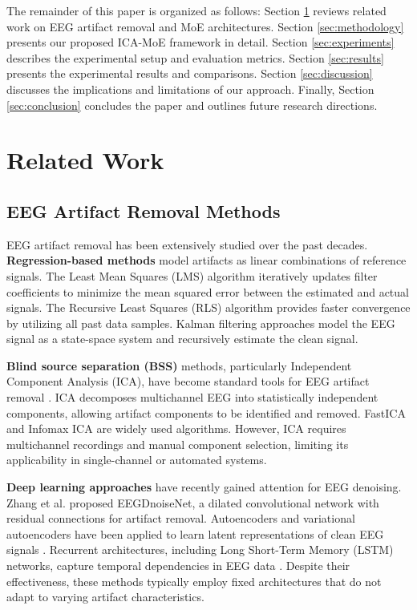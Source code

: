 \documentclass[journal]{IEEEtran}
\begin{document}
The remainder of this paper is organized as follows: Section \ref{sec:related_work} reviews related work on EEG artifact removal and MoE architectures. Section \ref{sec:methodology} presents our proposed ICA-MoE framework in detail. Section \ref{sec:experiments} describes the experimental setup and evaluation metrics. Section \ref{sec:results} presents the experimental results and comparisons. Section \ref{sec:discussion} discusses the implications and limitations of our approach. Finally, Section \ref{sec:conclusion} concludes the paper and outlines future research directions.

\section{Related Work}
\label{sec:related_work}

\subsection{EEG Artifact Removal Methods}

EEG artifact removal has been extensively studied over the past decades. \textbf{Regression-based methods} model artifacts as linear combinations of reference signals. The Least Mean Squares (LMS) algorithm \cite{widrow1975adaptive} iteratively updates filter coefficients to minimize the mean squared error between the estimated and actual signals. The Recursive Least Squares (RLS) algorithm \cite{haykin2014adaptive} provides faster convergence by utilizing all past data samples. Kalman filtering approaches \cite{morbidi2008application} model the EEG signal as a state-space system and recursively estimate the clean signal.

\textbf{Blind source separation (BSS)} methods, particularly Independent Component Analysis (ICA), have become standard tools for EEG artifact removal \cite{jung2000removing}. ICA decomposes multichannel EEG into statistically independent components, allowing artifact components to be identified and removed. FastICA \cite{hyvarinen1999fast} and Infomax ICA \cite{bell1995information} are widely used algorithms. However, ICA requires multichannel recordings and manual component selection, limiting its applicability in single-channel or automated systems.

\textbf{Deep learning approaches} have recently gained attention for EEG denoising. Zhang et al. \cite{zhang2021eegdenoisenet} proposed EEGDnoiseNet, a dilated convolutional network with residual connections for artifact removal. Autoencoders and variational autoencoders have been applied to learn latent representations of clean EEG signals \cite{yang2018automatic}. Recurrent architectures, including Long Short-Term Memory (LSTM) networks, capture temporal dependencies in EEG data \cite{lawhern2018eegnet}. Despite their effectiveness, these methods typically employ fixed architectures that do not adapt to varying artifact characteristics.
\end{document}
